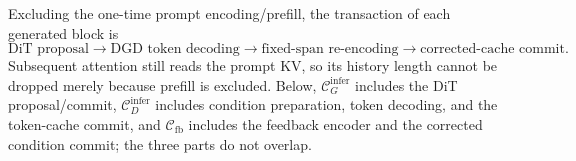 Excluding the one-time prompt encoding/prefill, the transaction of each generated block is
\begin{equation}
    \text{DiT proposal}
    \rightarrow\text{DGD token decoding}
    \rightarrow\text{fixed-span re-encoding}
    \rightarrow\text{corrected-cache commit}.
    \label{eq:app-cost-infer-transaction}
\end{equation}
Subsequent attention still reads the prompt KV, so its history length cannot be dropped merely because prefill is excluded. Below, $\mathcal C_G^{\mathrm{infer}}$ includes the DiT proposal/commit, $\mathcal C_D^{\mathrm{infer}}$ includes condition preparation, token decoding, and the token-cache commit, and $\mathcal C_{\mathrm{fb}}$ includes the feedback encoder and the corrected condition commit; the three parts do not overlap.

